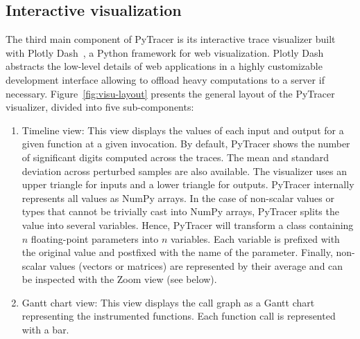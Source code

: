 \documentclass[11pt]{article}
\newcommand{\gkmod}[2]{\color{purple}\sout{#1} #2\color{black}\xspace}
\newcommand{\Yohan}[1]{\color{green!75!black}\textbf{Yohan:} #1\color{black}\xspace}
\newcommand{\pytracer}[0]{PyTracer\xspace}
\begin{document}
\subsection{Interactive visualization}
The third main component of \pytracer is its interactive trace visualizer built with Plotly Dash~\cite{plotly}, a Python framework for web visualization.
Plotly Dash abstracts the low-level details of web applications in a highly customizable development interface allowing to offload heavy computations to a server if necessary.
Figure~\ref{fig:visu-layout} presents the general layout of the \pytracer visualizer, divided into five sub-components:
\begin{enumerate}
 \item Timeline view: This view displays the values of each input and output for a given function at a given invocation. By default, \pytracer shows the number of significant digits computed across the traces. The mean and standard deviation across perturbed samples are also available. 
 The visualizer uses an upper triangle for inputs and a lower triangle for outputs. \pytracer internally represents all values as NumPy arrays. In the case of non-scalar values or types that cannot be trivially cast into NumPy arrays, \pytracer splits the value into several variables. Hence, \pytracer will transform a class containing $n$ floating-point parameters into $n$ variables. Each variable is prefixed with the original value and postfixed with the name of the parameter.
    Finally, non-scalar values (vectors or matrices) are represented by their average and can be inspected with the Zoom view (see below).
 \item Gantt chart view: This view displays the call graph as a Gantt chart representing the instrumented functions. Each function call is represented with a bar.

\end{enumerate}
\end{document}
